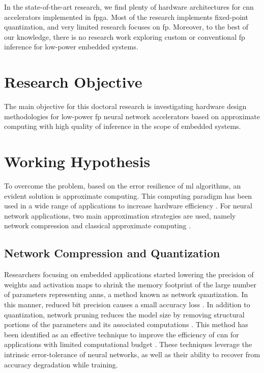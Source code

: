 In the state-of-the-art research, we find plenty of hardware architectures for \gls{cnn} accelerators implemented in \gls{fpga}. Most of the research implements fixed-point quantization, and very limited research focuses on \gls{fp}. Moreover, to the best of our knowledge, there is no research work exploring custom or conventional \gls{fp} inference for low-power embedded systems.

\section{Research Objective}
The main objective for this doctoral research is investigating hardware design methodologies for low-power \gls{fp} neural network accelerators based on approximate computing with high quality of inference in the scope of embedded systems.

\section{Working Hypothesis}
To overcome the problem, based on the error resilience of \gls{ml} algorithms, an evident solution is approximate computing. This computing paradigm has been used in a wide range of applications to increase hardware efficiency \cite{han2013approximate}. For neural network applications, two main approximation strategies are used, namely network compression and classical approximate computing \cite{bouvier2019spiking}.

\subsection{Network Compression and Quantization}
Researchers focusing on embedded applications started lowering the precision of weights and activation maps to shrink the memory footprint of the large number of parameters representing \glspl{ann}, a method known as network quantization. In this manner, reduced bit precision causes a small accuracy loss \cite{courbariaux2015binaryconnect, han2015deep, hubara2017quantized, rastegari2016xnor}. In addition to quantization, network pruning reduces the model size by removing structural portions of the parameters and its associated computations \cite{lecun1989optimal,hassibi1992second}. This method has been identified as an effective technique to improve the efficiency of \gls{cnn} for applications with limited computational budget \cite{molchanov2016pruning,li2016pruning, liu2018rethinking}. These techniques leverage the intrinsic error-tolerance of neural networks, as well as their ability to recover from accuracy degradation while training.

